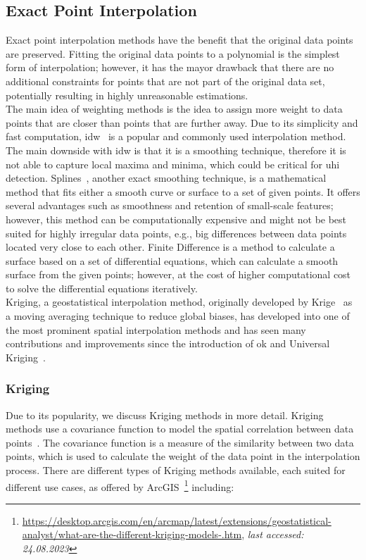 \subsection{Exact Point Interpolation}

Exact point interpolation methods have the benefit that the original data points are preserved. Fitting the original data points to a polynomial is the simplest form of interpolation; however, it has the mayor drawback that there are no additional constraints for points that are not part of the original data set, potentially resulting in highly unreasonable estimations.\\
The main idea of weighting methods is the idea to assign more weight to data points that are closer than points that are further away. Due to its simplicity and fast computation, \gls{idw}~\cite{willmott1985small} is a popular and commonly used interpolation method. The main downside with \gls{idw} is that it is a smoothing technique, therefore it is not able to capture local maxima and minima, which could be critical for \gls{uhi} detection. Splines~\cite{mitavs1988general}, another exact smoothing technique, is a mathematical method that fits either a smooth curve or surface to a set of given points. It offers several advantages such as smoothness and retention of small-scale features; however, this method can be computationally expensive and might not be best suited for highly irregular data points, e.g., big differences between data points located very close to each other. Finite Difference is a method to calculate a surface based on a set of differential equations, which can calculate a smooth surface from the given points; however, at the cost of higher computational cost to solve the differential equations iteratively.\\
Kriging, a geostatistical interpolation method, originally developed by Krige~\cite{krige1976review} as a moving averaging technique to reduce global biases, has developed into one of the most prominent spatial interpolation methods and has seen many contributions and improvements since the introduction of \gls{ok} and Universal Kriging~\cite{li2014spatial}.

\subsubsection{Kriging}

Due to its popularity, we discuss Kriging methods in more detail. Kriging methods use a covariance function to model the spatial correlation between data points~\cite{wackernagel2003multivariate}. The covariance function is a measure of the similarity between two data points, which is used to calculate the weight of the data point in the interpolation process. There are different types of Kriging methods available, each suited for different use cases, as offered by ArcGIS~\footnote{\url{https://desktop.arcgis.com/en/arcmap/latest/extensions/geostatistical-analyst/what-are-the-different-kriging-models-.htm}, \textit{last accessed: 24.08.2023}} including:

